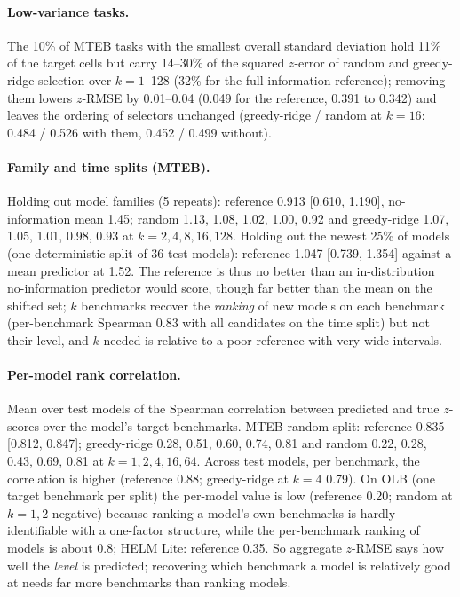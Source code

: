 \documentclass{article}
\begin{document}
\paragraph{Low-variance tasks.} The 10\% of MTEB tasks with the smallest overall standard deviation hold 11\% of the target cells but carry 14--30\% of the squared $z$-error of random and greedy-ridge selection over $k=1$--128 (32\% for the full-information reference); removing them lowers $z$-RMSE by 0.01--0.04 (0.049 for the reference, 0.391 to 0.342) and leaves the ordering of selectors unchanged (greedy-ridge / random at $k=16$: 0.484 / 0.526 with them, 0.452 / 0.499 without).

\paragraph{Family and time splits (MTEB).} Holding out model families (5 repeats): reference 0.913 [0.610, 1.190], no-information mean 1.45; random 1.13, 1.08, 1.02, 1.00, 0.92 and greedy-ridge 1.07, 1.05, 1.01, 0.98, 0.93 at $k=2,4,8,16,128$. Holding out the newest 25\% of models (one deterministic split of 36 test models): reference 1.047 [0.739, 1.354] against a mean predictor at 1.52. The reference is thus no better than an in-distribution no-information predictor would score, though far better than the mean on the shifted set; $k$ benchmarks recover the \emph{ranking} of new models on each benchmark (per-benchmark Spearman 0.83 with all candidates on the time split) but not their level, and $k$ needed is relative to a poor reference with very wide intervals.

\paragraph{Per-model rank correlation.} Mean over test models of the Spearman correlation between predicted and true $z$-scores over the model's target benchmarks. MTEB random split: reference 0.835 [0.812, 0.847]; greedy-ridge 0.28, 0.51, 0.60, 0.74, 0.81 and random 0.22, 0.28, 0.43, 0.69, 0.81 at $k=1,2,4,16,64$. Across test models, per benchmark, the correlation is higher (reference 0.88; greedy-ridge at $k=4$ 0.79). On OLB (one target benchmark per split) the per-model value is low (reference 0.20; random at $k=1,2$ negative) because ranking a model's own benchmarks is hardly identifiable with a one-factor structure, while the per-benchmark ranking of models is about 0.8; HELM Lite: reference 0.35. So aggregate $z$-RMSE says how well the \emph{level} is predicted; recovering which benchmark a model is relatively good at needs far more benchmarks than ranking models.
\end{document}
